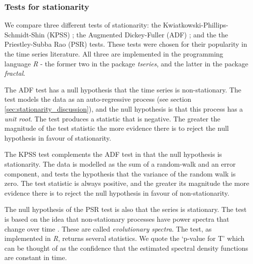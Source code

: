 
\subsubsection{Tests for stationarity}
\label{sec:stat_tests}

We compare three different tests of stationarity: the Kwiatkowski-Phillips-Schmidt-Shin (KPSS) \cite{kwiatkowski1992testing}; the Augmented Dickey-Fuller (ADF) \cite{said1984testing}; and the the Priestley-Subba Rao (PSR) \cite{priestley1969test} tests. These tests were chosen for their popularity in the time series literature. All three are implemented in the programming language \emph{R} \cite{Rlanguage} - the former two in the package \emph{tseries}, and the latter in the package \emph{fractal}.

The ADF test has a null hypothesis that the time series is non-stationary. The test models the data as an auto-regressive process (see section \ref{sec:stationarity_discussion}), and the null hypothesis is that this process has a \emph{unit root}. The test produces a statistic that is negative. The greater the magnitude of the test statistic the more evidence there is to reject the null hypothesis in favour of stationarity.

The KPSS test complements the ADF test in that the null hypothesis is stationarity. The data is modelled as the sum of a random-walk and an error component, and tests the hypothesis that the variance of the random walk is zero. The test statistic is always positive, and the greater its magnitude the more evidence there is to reject the null hypothesis in favour of non-stationarity.

The null hypothesis of the PSR test is also that the series is stationary. The test is based on the idea that non-stationary processes have power spectra that change over time \cite{priestley1969test}. These are called \emph{evolutionary spectra}. The test, as implemented in \emph{R}, returns several statistics. We quote the `p-value for T' which can be thought of as the confidence that the estimated spectral density functions are constant in time.

